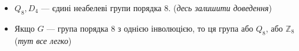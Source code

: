 \documentclass{math_library}
\begin{document}
\begin{itemize}[wide=0pt]
\item $Q_8,D_4$ --- єдині неабелеві групи порядка $8$. (\textit{десь залишити доведення})

\item Якщо $G$ --- група порядка $8$ з однією інволюцією, то ця група або $Q_8$, або $\mathbb{Z}_8$ (\textit{тут все легко})
\end{itemize}
\end{document}
